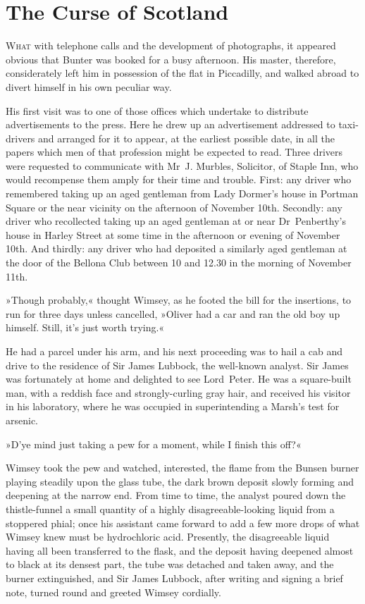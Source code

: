 \chapter{The Curse of Scotland}

\lettrine[lines=4]{W}{hat} with telephone calls and the development of photographs, it appeared obvious that Bunter was booked for a busy afternoon. His master, therefore, considerately left him in possession of the flat in Piccadilly, and walked abroad to divert himself in his own peculiar way.

His first visit was to one of those offices which undertake to distribute advertisements to the press. Here he drew up an advertisement addressed to taxi-drivers and arranged for it to appear, at the earliest possible date, in all the papers which men of that profession might be expected to read. Three drivers were requested to communicate with Mr~J. Murbles, Solicitor, of Staple Inn, who would recompense them amply for their time and trouble. First: any driver who remembered taking up an aged gentleman from Lady Dormer's house in Portman Square or the near vicinity on the afternoon of November 10th. Secondly: any driver who recollected taking up an aged gentleman at or near Dr~Penberthy's house in Harley Street at some time in the afternoon or evening of November 10th. And thirdly: any driver who had deposited a similarly aged gentleman at the door of the Bellona Club between 10 and 12.30 in the morning of November 11th.

»Though probably,« thought Wimsey, as he footed the bill for the insertions, to run for three days unless cancelled, »Oliver had a car and ran the old boy up himself. Still, it's just worth trying.«

He had a parcel under his arm, and his next proceeding was to hail a cab and drive to the residence of Sir James Lubbock, the well-known analyst. Sir James was fortunately at home and delighted to see Lord~Peter. He was a square-built man, with a reddish face and strongly-curling gray hair, and received his visitor in his laboratory, where he was occupied in superintending a Marsh's test for arsenic.

»D'ye mind just taking a pew for a moment, while I finish this off?«

Wimsey took the pew and watched, interested, the flame from the Bunsen burner playing steadily upon the glass tube, the dark brown deposit slowly forming and deepening at the narrow end. From time to time, the analyst poured down the thistle-funnel a small quantity of a highly disagreeable-looking liquid from a stoppered phial; once his assistant came forward to add a few more drops of what Wimsey knew must be hydrochloric acid. Presently, the disagreeable liquid having all been transferred to the flask, and the deposit having deepened almost to black at its densest part, the tube was detached and taken away, and the burner extinguished, and Sir James Lubbock, after writing and signing a brief note, turned round and greeted Wimsey cordially.

